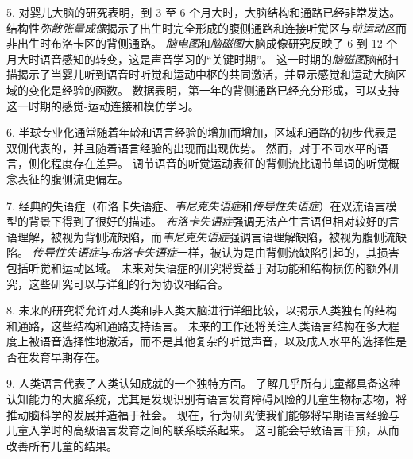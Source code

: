 5. 对婴儿大脑的研究表明，到 3 至 6 个月大时，大脑结构和通路已经非常发达。
结构性\textit{弥散张量成像}揭示了出生时完全形成的腹侧通路和连接听觉区与\textit{前运动区}而非出生时布洛卡区的背侧通路。
\textit{脑电图}和\textit{脑磁图}大脑成像研究反映了 6 到 12 个月大时语音感知的转变，这是声音学习的“关键时期”。
这一时期的\textit{脑磁图}脑部扫描揭示了当婴儿听到语音时听觉和运动中枢的共同激活，并显示感觉和运动大脑区域的变化是经验的函数。
数据表明，第一年的背侧通路已经充分形成，可以支持这一时期的感觉-运动连接和模仿学习。


6. 半球专业化通常随着年龄和语言经验的增加而增加，区域和通路的初步代表是双侧代表的，并且随着语言经验的出现而出现优势。
然而，对于不同水平的语言，侧化程度存在差异。
调节语音的听觉运动表征的背侧流比调节单词的听觉概念表征的腹侧流更偏左。


7. 经典的失语症（布洛卡失语症、\textit{韦尼克失语症}和\textit{传导性失语症}）在双流语言模型的背景下得到了很好的描述。
\textit{布洛卡失语症}强调无法产生言语但相对较好的言语理解，被视为背侧流缺陷，而\textit{韦尼克失语症}强调言语理解缺陷，被视为腹侧流缺陷。
\textit{传导性失语症}与\textit{布洛卡失语症}一样，被认为是由背侧流缺陷引起的，其损害包括听觉和运动区域。
未来对失语症的研究将受益于对功能和结构损伤的额外研究，这些研究可以与详细的行为协议相结合。


8. 未来的研究将允许对人类和非人类大脑进行详细比较，以揭示人类独有的结构和通路，这些结构和通路支持语言。
未来的工作还将关注人类语言结构在多大程度上被语音选择性地激活，而不是其他复杂的听觉声音，以及成人水平的选择性是否在发育早期存在。 


9. 人类语言代表了人类认知成就的一个独特方面。
了解几乎所有儿童都具备这种认知能力的大脑系统，尤其是发现识别有语言发育障碍风险的儿童生物标志物，将推动脑科学的发展并造福于社会。
现在，行为研究使我们能够将早期语言经验与儿童入学时的高级语言发育之间的联系联系起来。
这可能会导致语言干预，从而改善所有儿童的结果。



